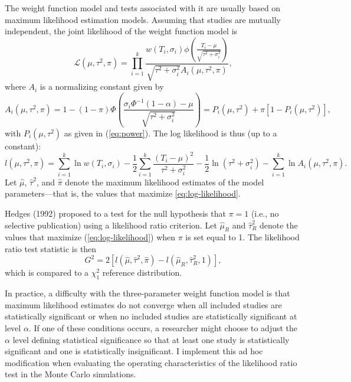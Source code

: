 \documentclass[man,floatsintext]{apa6}
\begin{document}
The weight function model and tests associated with it are usually based on maximum likelihood estimation models.
Assuming that studies are mutually independent, the joint likelihood of the weight function model is
\begin{equation}
\mathcal{L}(\mu, \tau^2, \pi) = \prod_{i=1}^k \frac{w(T_i, \sigma_i) \phi\left(\frac{T_i - \mu}{\sqrt{\tau^2 + \sigma_i^2}}\right)}{\sqrt{\tau^2 + \sigma_i^2} A_i(\mu, \tau^2, \pi)},
\label{eq:Likelihood}
\end{equation}
where \(A_i\) is a normalizing constant given by
\[
A_i(\mu, \tau^2, \pi) = 1 - (1 - \pi)\Phi\left( \frac{\sigma_i \Phi^{-1}(1 - \alpha) - \mu}{\sqrt{\tau^2 + \sigma_i^2}}\right) = P_i(\mu, \tau^2) + \pi \left[1 - P_i(\mu, \tau^2)\right],
\]
with \(P_i(\mu, \tau^2)\) as given in (\ref{eq:power}). The log likelihood is thus (up to a constant):
\begin{equation}
l(\mu, \tau^2, \pi) = \sum_{i=1}^k \ln w(T_i, \sigma_i) - \frac{1}{2} \sum_{i=1}^k \frac{(T_i - \mu)^2}{\tau^2 + \sigma_i^2} - \frac{1}{2} \ln(\tau^2 + \sigma_i^2) - \sum_{i=1}^k \ln A_i(\mu, \tau^2, \pi).
\label{eq:log-likelihood}
\end{equation}
Let \(\hat\mu\), \(\hat\tau^2\), and \(\hat\pi\) denote the maximum likelihood estimates of the model parameters---that is, the values that maximize \eqref{eq:log-likelihood}.

Hedges (1992) proposed to a test for the null hypothesis that \(\pi = 1\) (i.e., no selective publication) using a likelihood ratio criterion.
Let \(\hat\mu_R\) and \(\hat\tau^2_R\) denote the values that maximize (\ref{eq:log-likelihood}) when \(\pi\) is set equal to 1. The likelihood ratio test statistic is then
\begin{equation}
G^2 = 2 \left[l(\hat\mu, \hat\tau^2, \hat\pi) - l(\hat\mu_R, \hat\tau_R^2, 1)\right],
\label{eq:LRT}
\end{equation}
which is compared to a \(\chi^2_1\) reference distribution.

In practice, a difficulty with the three-parameter weight function model is that maximum likelihood estimates do not converge when all included studies are statistically significant or when no included studies are statistically significant at level \(\alpha\).
If one of these conditions occurs, a researcher might choose to adjust the \(\alpha\) level defining statistical significance so that at least one study is statistically significant and one is statistically insignificant.
I implement this ad hoc modification when evaluating the operating characteristics of the likelihood ratio test in the Monte Carlo simulations.
\end{document}
